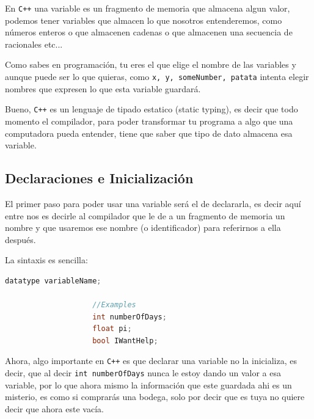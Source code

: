 \documentclass[12pt, fleqn]{report}                             %
\theoremstyle{break}                                            %
\newcommand{\textCode}[1]  { \texttt{#1} }                      %
\newcommand \Cpp  {\textCode{C++} }                               %
\begin{document}
            En \Cpp una variable es un fragmento de memoria que almacena algun valor, 
            podemos tener variables que almacen lo que nosotros entenderemos, como números enteros
            o que almacenen cadenas o que almacenen una secuencia de racionales etc...

            Como sabes en programación, tu eres el que elige el nombre de las variables y aunque puede
            ser lo que quieras, como \textCode{x, y, someNumber, patata} intenta elegir nombres que expresen
            lo que esta variable guardará.

            Bueno, \Cpp es un lenguaje de tipado estatico (static typing), es decir que todo momento el compilador,
            para poder transformar tu programa a algo que una computadora pueda entender, tiene
            que saber que tipo de dato almacena esa variable.

            \subsection{Declaraciones e Inicialización}

                El primer paso para poder usar una variable será el de declararla, es decir
                aquí entre nos es decirle al compilador que le de a un fragmento de memoria 
                un nombre y que usaremos ese nombre (o identificador) para referirnos a ella después.

                La sintaxis es sencilla:
                \begin{lstlisting}[language=C++, gobble=20]
                    datatype variableName;

                    //Examples
                    int numberOfDays;
                    float pi;
                    bool IWantHelp;
                \end{lstlisting}

                Ahora, algo importante en \Cpp es que declarar una variable no la inicializa, 
                es decir, que al decir \textCode{int numberOfDays} nunca le estoy dando un valor a
                esa variable, por lo que ahora mismo la información que este guardada ahi es un misterio,
                es como si comprarás una bodega, solo por decir que es tuya no quiere decir que ahora este
                vacía.
\end{document}
